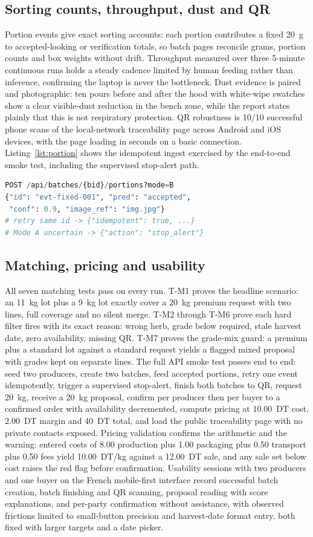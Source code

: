\documentclass[10pt,conference,a4paper]{IEEEtran}
\begin{document}
\subsection{Sorting counts, throughput, dust and QR}
Portion events give exact sorting accounts: each portion contributes a fixed 20~g to accepted-looking or verification totals, so batch pages reconcile grams, portion counts and box weights without drift. Throughput measured over three 5-minute continuous runs holds a steady cadence limited by human feeding rather than inference, confirming the laptop is never the bottleneck. Dust evidence is paired and photographic: ten pours before and after the hood with white-wipe swatches show a clear visible-dust reduction in the bench zone, while the report states plainly that this is not respiratory protection. QR robustness is 10/10 successful phone scans of the local-network traceability page across Android and iOS devices, with the page loading in seconds on a basic connection. Listing~\ref{lst:portion} shows the idempotent ingest exercised by the end-to-end smoke test, including the supervised stop-alert path.
\begin{lstlisting}[language=Python,caption={Idempotent portion ingest with supervised stop path.},label={lst:portion}]
POST /api/batches/{bid}/portions?mode=B
{"id": "evt-fixed-001", "pred": "accepted",
 "conf": 0.9, "image_ref": "img.jpg"}
# retry same id -> {"idempotent": true, ...}
# Mode A uncertain -> {"action": "stop_alert"}
\end{lstlisting}
\subsection{Matching, pricing and usability}
All seven matching tests pass on every run. T-M1 proves the headline scenario: an 11~kg lot plus a 9~kg lot exactly cover a 20~kg premium request with two lines, full coverage and no silent merge. T-M2 through T-M6 prove each hard filter fires with its exact reason: wrong herb, grade below required, stale harvest date, zero availability, missing QR. T-M7 proves the grade-mix guard: a premium plus a standard lot against a standard request yields a flagged mixed proposal with grades kept on separate lines. The full API smoke test passes end to end: seed two producers, create two batches, feed accepted portions, retry one event idempotently, trigger a supervised stop-alert, finish both batches to QR, request 20~kg, receive a 20~kg proposal, confirm per producer then per buyer to a confirmed order with availability decremented, compute pricing at 10.00~DT cost, 2.00~DT margin and 40~DT total, and load the public traceability page with no private contacts exposed.
Pricing validation confirms the arithmetic and the warning: entered costs of 8.00 production plus 1.00 packaging plus 0.50 transport plus 0.50 fees yield 10.00~DT/kg against a 12.00~DT sale, and any sale set below cost raises the red flag before confirmation. Usability sessions with two producers and one buyer on the French mobile-first interface record successful batch creation, batch finishing and QR scanning, proposal reading with score explanations, and per-party confirmation without assistance, with observed frictions limited to small-button precision and harvest-date format entry, both fixed with larger targets and a date picker.
\end{document}
